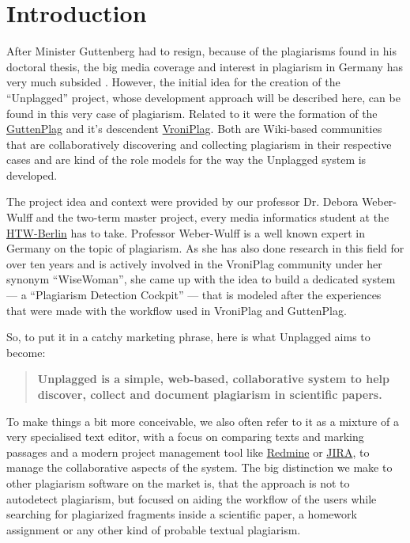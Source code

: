 \chapter*{Introduction}
After Minister Guttenberg had to resign, because of the plagiarisms found in his doctoral thesis,
the big media coverage and interest in plagiarism in Germany has very much subsided 
\citep{Google2012}. However, the initial idea for the 
creation of the \enquote{Unplagged} project, whose development approach will be described here, can be found in this 
very case of plagiarism. Related to it were the formation of the
\href{http://de.guttenplag.wikia.com/wiki/GuttenPlag\_Wiki}{GuttenPlag} and it's descendent 
\href{http://de.vroniplag.wikia.com/wiki/Home}{VroniPlag}. Both are Wiki-based communities that are collaboratively 
discovering and collecting plagiarism in their respective cases and are kind of the role models for the way the
Unplagged system is developed.

The project idea and context were provided by our professor Dr. Debora Weber-Wulff and the two-term master project,
every media informatics student at the \href{http://htw-berlin.de/}{HTW-Berlin} has to take. Professor Weber-Wulff is 
a well known expert in Germany on the topic of plagiarism. As she has also done research in this 
field for over ten years and is actively involved in the VroniPlag community under her 
synonym \enquote{WiseWoman}\citep{Spiegel-Online2011}, she came up with the idea to build a dedicated system --- a 
\enquote{Plagiarism Detection Cockpit}\citep{Weber-Wulff2011} --- 
that is modeled after the experiences that were made with the workflow used in VroniPlag and GuttenPlag.

So, to put it in a catchy marketing phrase, here is what Unplagged aims to become: 

\begin{quote}
\textbf{Unplagged is a simple, web-based, collaborative system to help discover, collect and 
document plagiarism in scientific papers.}
\end{quote}

To make things a bit more conceivable, we also often refer to it as a mixture of a very specialised text editor, with a focus on 
comparing texts and marking 
passages and a modern project management tool like \href{http://www.redmine.org/}{Redmine} or 
\href{http://www.atlassian.com/JIRA}{JIRA}, 
to manage the collaborative aspects of the system. The big distinction we make to other plagiarism software on the market is, 
that the approach is not to autodetect plagiarism, but focused on aiding the workflow of the users while  
searching for plagiarized
fragments inside a scientific paper, a homework assignment or any other kind of probable textual plagiarism.

